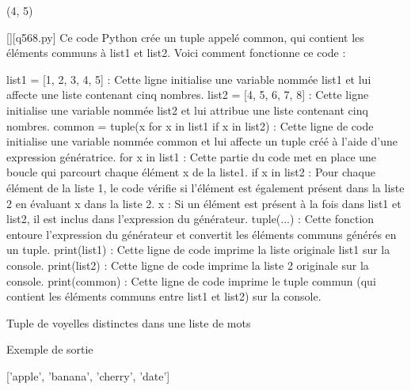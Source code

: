 (4, 5)
        \par
        \begin{solution}
            \renewcommand{\nomfichier}{q568.py}
            \pythonfile{\chemincode \nomfichier}[][\nomfichier]
            Ce code Python crée un tuple appelé common, qui contient les éléments communs à list1 et list2. Voici comment fonctionne ce code :

    list1 = [1, 2, 3, 4, 5] : Cette ligne initialise une variable nommée list1 et lui affecte une liste contenant cinq nombres.
    list2 = [4, 5, 6, 7, 8] : Cette ligne initialise une variable nommée list2 et lui attribue une liste contenant cinq nombres.
    common = tuple(x for x in list1 if x in list2) : Cette ligne de code initialise une variable nommée common et lui affecte un tuple créé à l'aide d'une expression génératrice.
        for x in list1 : Cette partie du code met en place une boucle qui parcourt chaque élément x de la liste1.
        if x in list2 : Pour chaque élément de la liste 1, le code vérifie si l'élément est également présent dans la liste 2 en évaluant x dans la liste 2.
        x : Si un élément est présent à la fois dans list1 et list2, il est inclus dans l'expression du générateur.
        tuple(...) : Cette fonction entoure l'expression du générateur et convertit les éléments communs générés en un tuple.
    print(list1) : Cette ligne de code imprime la liste originale list1 sur la console.
    print(list2) : Cette ligne de code imprime la liste 2 originale sur la console.
    print(common) : Cette ligne de code imprime le tuple commun (qui contient les éléments communs entre list1 et list2) sur la console.
        \end{solution}
        

        \question
        Tuple de voyelles distinctes dans une liste de mots

Exemple de sortie

['apple', 'banana', 'cherry', 'date']

